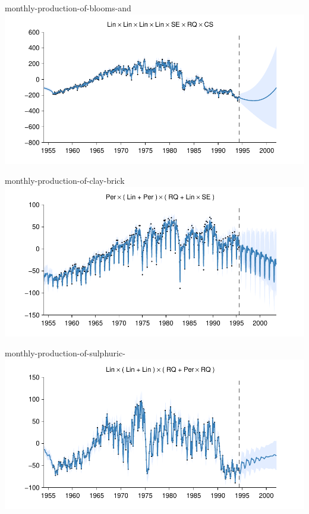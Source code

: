 \begin{frame}{monthly-production-of-blooms-and}
  \center
  \includegraphics[width=1.0\textwidth]{figures/monthly-production-of-blooms-and/monthly-production-of-blooms-and_all}
\end{frame}  
    
\begin{frame}{monthly-production-of-clay-brick}
  \center
  \includegraphics[width=1.0\textwidth]{figures/monthly-production-of-clay-brick/monthly-production-of-clay-brick_all}
\end{frame} 
    
\begin{frame}{monthly-production-of-sulphuric-}
  \center
  \includegraphics[width=1.0\textwidth]{figures/monthly-production-of-sulphuric-/monthly-production-of-sulphuric-_all}
\end{frame}  
    
